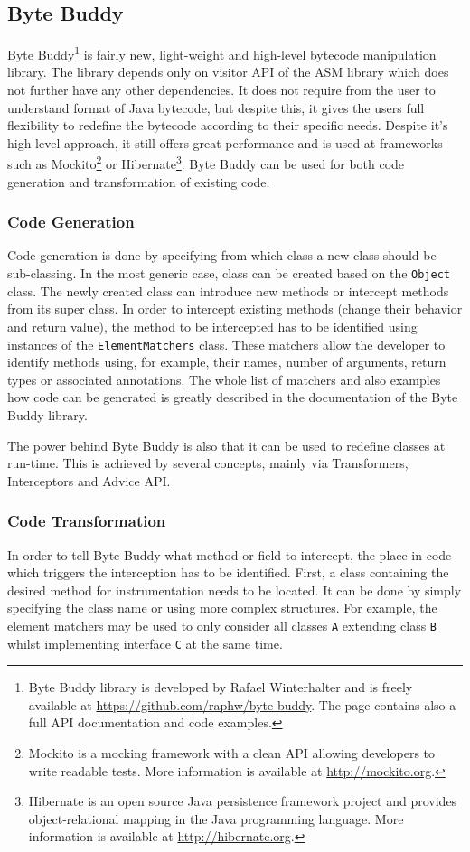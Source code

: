 \subsection{Byte Buddy}
\label{sec:byte_buddy}
Byte Buddy\footnote{Byte Buddy library is developed by Rafael Winterhalter and is freely available at \url{https://github.com/raphw/byte-buddy}. The page contains also a full API documentation and code examples.} is fairly new, light-weight and high-level bytecode manipulation library. The library depends only on visitor API of the ASM library which does not further have any other dependencies. It does not require from the user to understand format of Java bytecode, but despite this, it gives the users full flexibility to redefine the bytecode according to their specific needs. Despite it's high-level approach, it still offers great performance \cite{ByteBuddy_Perf} and is used at frameworks such as Mockito\footnote{Mockito is a mocking framework with a clean API allowing developers to write readable tests. More information is available at \url{http://mockito.org}.} or Hibernate\footnote{Hibernate is an open source Java persistence framework project and provides object-relational mapping in the Java programming language. More information is available at \url{http://hibernate.org}.}. Byte Buddy can be used for both code generation and transformation of existing code.

\subsubsection{Code Generation}
Code generation is done by specifying from which class a new class should be sub-classing. In the most generic case, class can be created based on the \texttt{Object} class. The newly created class can introduce new methods or intercept methods from its super class. In order to intercept existing methods (change their behavior and return value), the method to be intercepted has to be identified using instances of the \texttt{ElementMatchers} class. These matchers allow the developer to identify methods using, for example, their names, number of arguments, return types or associated annotations. The whole list of matchers and also examples how code can be generated is greatly described in the documentation of the Byte Buddy library.

The power behind Byte Buddy is also that it can be used to redefine classes at run-time. This is achieved by several concepts, mainly via Transformers, Interceptors and Advice API.
\subsubsection{Code Transformation}
\label{back:code_transform}
In order to tell Byte Buddy what method or field to intercept, the place in code which triggers the interception has to be identified. First, a class containing the desired method for instrumentation needs to be located. It can be done by simply specifying the class name or using more complex structures. For example, the element matchers may be used to only consider all classes \texttt{A} extending class \texttt{B} whilst implementing interface \texttt{C} at the same time. 

